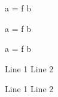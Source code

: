 
\begin{code}
   a =
     f b
\end{code}


\begin{code}
a =
  f b
\end{code}



\begin{code}
     a =
       f b
\end{code}



Line 1
Line 2

Line 1
Line 2



